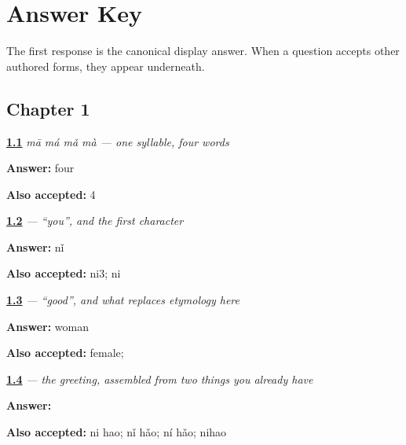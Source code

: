 \chapter*{Answer Key}

The first response is the canonical display answer. When a question accepts other authored forms, they appear underneath.

\section*{Chapter 1}

\noindent\begin{minipage}[t]{\linewidth}
\raggedright
\hyperlink{review-ZH-C01-tones-count}{\textbf{1.1}} \emph{mā má mǎ mà — one syllable, four words}\par
\small \textbf{Answer:} four\par
\footnotesize \textbf{Also accepted:} 4
\end{minipage}\par\medskip

\noindent\begin{minipage}[t]{\linewidth}
\raggedright
\hyperlink{review-ZH-C01-ni-meaning}{\textbf{1.2}} \emph{ — \textquotedblleft{}you\textquotedblright{}, and the first character}\par
\small \textbf{Answer:} nǐ\par
\footnotesize \textbf{Also accepted:} ni3; ni
\end{minipage}\par\medskip

\noindent\begin{minipage}[t]{\linewidth}
\raggedright
\hyperlink{review-ZH-C01-hao-components}{\textbf{1.3}} \emph{ — \textquotedblleft{}good\textquotedblright{}, and what replaces etymology here}\par
\small \textbf{Answer:} woman\par
\footnotesize \textbf{Also accepted:} female; 
\end{minipage}\par\medskip

\noindent\begin{minipage}[t]{\linewidth}
\raggedright
\hyperlink{review-ZH-C01-nihao-greeting}{\textbf{1.4}} \emph{ — the greeting, assembled from two things you already have}\par
\small \textbf{Answer:} \par
\footnotesize \textbf{Also accepted:} ni hao; nǐ hǎo; ní hǎo; nihao
\end{minipage}\par\medskip

